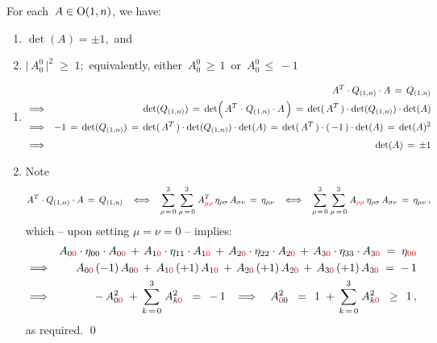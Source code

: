 \vskip 0.5cm
\begin{proposition}
\mbox{}
\vskip 0.1cm
\noindent
For each \,$A \in \textnormal{O}(1,n)$, we have:
\begin{enumerate}
\item
	$\det(A) = \pm 1$,\, and
\item
	$\vert\,A^{0}_{0}\,\vert^{2} \;\geq\; 1$;\, equivalently, either \,$A^{0}_{0} \,\geq\, 1$\, or \,$A^{0}_{0} \,\leq\, -1$
\end{enumerate}
\end{proposition}
\proof
\begin{enumerate}
\item
	\begin{eqnarray*}
	&&
		A^{T} \cdot Q_{(1,n)} \cdot A \,=\, Q_{(1,n)}
	\\
	& \Longrightarrow &
		\det(Q_{(1,n)})
		\, = \,
		\det\!\left(\,A^{T} \overset{{\color{white}1}}{\cdot} Q_{(1,n)} \cdot A\,\right)
		\,=\,
		\det(\,A^{T}\,) \cdot \det(Q_{(1,n)}) \cdot \det(A)
	\\
	& \Longrightarrow &
		-1
		\, = \,
		\det(Q_{(1,n)})
		\, = \,
		\det(\,A^{T}\,) \cdot \det(Q_{(1,n)}) \cdot \det(A)
		\, = \,
		\det(\,A^{T}\,) \cdot (\,-1\,)\cdot \det(A)
		\, = \,
		\det(A)^{2}
	\\
	& \Longrightarrow &
		\det(A)
		\, \overset{{\color{white}1}}{=} \,
		\pm 1
	\end{eqnarray*}
\item
	Note
	\begin{equation*}
	A^{T} \cdot Q_{(1,n)} \cdot A \,=\, Q_{(1,n)}
	\;\;\;\Longleftrightarrow\;\;\;
	\overset{3}{\underset{\rho\,=\,0}{\sum}}\;
		\overset{3}{\underset{\mu\,=\,0}{\sum}}\;
		A^{T}_{{\color{red}\mu\rho}}\,\eta_{\rho\sigma}\,A_{\sigma\nu}
		\, = \,
		\eta_{\mu\nu}
	\;\;\;\Longleftrightarrow\;\;\;
	\overset{3}{\underset{\rho\,=\,0}{\sum}}\;
		\overset{3}{\underset{\mu\,=\,0}{\sum}}\;
		A_{{\color{red}\rho\mu}}\,\eta_{\rho\sigma}\,A_{\sigma\nu}
		\, = \,
		\eta_{\mu\nu}\,,
	\end{equation*}
	which -- upon setting $\mu = \nu = 0$ -- implies:
	\begin{eqnarray*}
	&&
		A_{0{\color{red}0}} \cdot \eta_{00} \cdot A_{0{\color{red}0}}
		\,+\,
		A_{1{\color{red}0}} \cdot \eta_{11} \cdot A_{1{\color{red}0}}
		\,+\,
		A_{2{\color{red}0}} \cdot \eta_{22} \cdot A_{2{\color{red}0}}
		\,+\,
		A_{3{\color{red}0}} \cdot \eta_{33} \cdot A_{3{\color{red}0}}
		\; = \;
		\eta_{{\color{red}00}}
	\\
	& \Longrightarrow &
		A_{0{\color{red}0}}\,(-1)\,A_{0{\color{red}0}}
		\,+\,
		A_{1{\color{red}0}}\,(+1)\,A_{1{\color{red}0}}
		\,+\,
		A_{2{\color{red}0}}\,(+1)\,A_{2{\color{red}0}}
		\,+\,
		A_{3{\color{red}0}}\,(+1)\,A_{3{\color{red}0}}
		\; = \;
		-\,1
	\\
	& \Longrightarrow &
		- \, A_{0{\color{red}0}}^{2}
		\; + \,
		\overset{3}{\underset{k\,=\,0}{\sum}}\;
		A_{k{\color{red}0}}^{2}
		\;\; = \;\,
			-\,1
	\;\;\; \Longrightarrow \;\;\;\,
		A_{{\color{red}0}0}^{2}
		\;\; = \;\,
			1
			\; + \,
			\overset{3}{\underset{k\,=\,0}{\sum}}\;
			A_{k{\color{red}0}}^{2}
		\;\; \geq \;\,
			1\,,
	\end{eqnarray*}
	as required.
	\qed
\end{enumerate}

